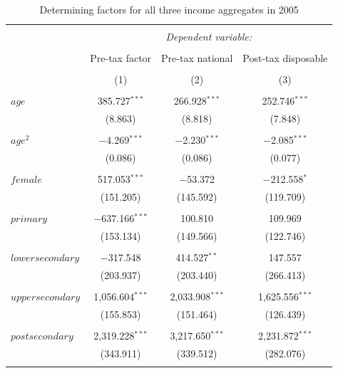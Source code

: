 \documentclass[a4paper]{article}\usepackage[]{graphicx}\usepackage[]{color}
\begin{document}
\begin{table}[H] \centering 
  \caption{Determining factors for all three income aggregates in 2005} 
  \label{ols2005} 
\begin{tabular}{@{\extracolsep{5pt}}lccc} 
\\[-1.8ex]\hline 
\hline \\[-1.8ex] 
 & \multicolumn{3}{c}{\textit{Dependent variable:}} \\ 
\cline{2-4} 
\\[-1.8ex] & Pre-tax factor & Pre-tax national & Post-tax disposable \\ 
\\[-1.8ex] & (1) & (2) & (3)\\ 
\hline \\[-1.8ex] 
 $age$ & 385.727$^{***}$ & 266.928$^{***}$ & 252.746$^{***}$ \\ 
  & (8.863) & (8.818) & (7.848) \\ 
  & & & \\ 
 $age^2$ & $-$4.269$^{***}$ & $-$2.230$^{***}$ & $-$2.085$^{***}$ \\ 
  & (0.086) & (0.086) & (0.077) \\ 
  & & & \\ 
 $female$ & 517.053$^{***}$ & $-$53.372 & $-$212.558$^{*}$ \\ 
  & (151.205) & (145.592) & (119.709) \\ 
  & & & \\ 
 $primary$ & $-$637.166$^{***}$ & 100.810 & 109.969 \\ 
  & (153.134) & (149.566) & (122.746) \\ 
  & & & \\ 
 $lower secondary$ & $-$317.548 & 414.527$^{**}$ & 147.557 \\ 
  & (203.937) & (203.440) & (266.413) \\ 
  & & & \\ 
 $upper secondary$ & 1,056.604$^{***}$ & 2,033.908$^{***}$ & 1,625.556$^{***}$ \\ 
  & (155.853) & (151.464) & (126.439) \\ 
  & & & \\ 
 $post secondary$ & 2,319.228$^{***}$ & 3,217.650$^{***}$ & 2,231.872$^{***}$ \\ 
  & (343.911) & (339.512) & (282.076) \\ 
  & & & \\ 

\end{tabular}
\end{table}
\end{document}
